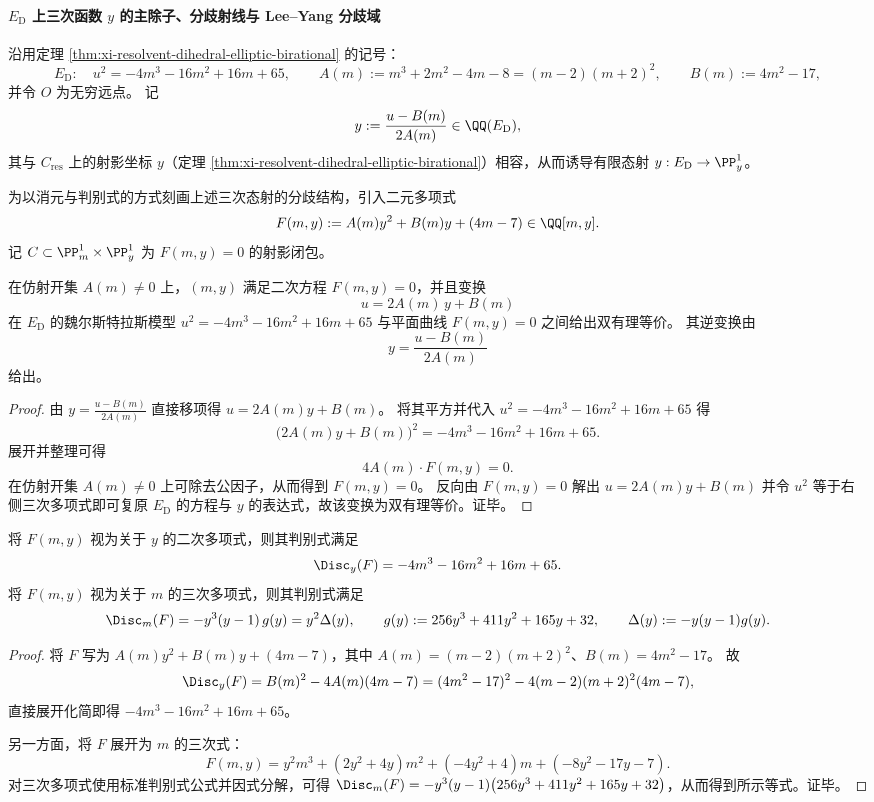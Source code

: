 \paragraph{\texorpdfstring{$E_{\mathrm D}$}{ED} 上三次函数 \texorpdfstring{$y$}{y} 的主除子、分歧射线与 Lee--Yang 分歧域}
沿用定理 \ref{thm:xi-resolvent-dihedral-elliptic-birational} 的记号：
\[
E_{\mathrm D}:\quad u^{2}=-4m^{3}-16m^{2}+16m+65,
\qquad
A(m):=m^{3}+2m^{2}-4m-8=(m-2)(m+2)^{2},
\qquad
B(m):=4m^{2}-17,
\]
并令 \(O\) 为无穷远点。
记
\[
y:=\frac{u-B(m)}{2A(m)}\in \QQ(E_{\mathrm D}),
\]
其与 \(C_{\mathrm{res}}\) 上的射影坐标 \(y\)（定理 \ref{thm:xi-resolvent-dihedral-elliptic-birational}）相容，从而诱导有限态射
\(
y:E_{\mathrm D}\to\PP^1_y
\)。

\par
为以消元与判别式的方式刻画上述三次态射的分歧结构，引入二元多项式
\[
F(m,y):=A(m)y^2+B(m)y+(4m-7)\in\QQ[m,y].
\]
记 \(C\subset \PP^1_m\times \PP^1_y\) 为 \(F(m,y)=0\) 的射影闭包。

\begin{theorem}[二次平面模型与双坐标的显式双有理等价]\label{thm:xi-ed-plane-quadratic-birational-equivalence}
在仿射开集 \(A(m)\neq 0\) 上，\((m,y)\) 满足二次方程 \(F(m,y)=0\)，并且变换
\[
u=2A(m)\,y+B(m)
\]
在 \(E_{\mathrm D}\) 的魏尔斯特拉斯模型 \(u^2=-4m^3-16m^2+16m+65\) 与平面曲线 \(F(m,y)=0\) 之间给出双有理等价。
其逆变换由
\[
y=\frac{u-B(m)}{2A(m)}
\]
给出。
\end{theorem}
\begin{proof}
由 \(y=\frac{u-B(m)}{2A(m)}\) 直接移项得 \(u=2A(m)y+B(m)\)。
将其平方并代入 \(u^2=-4m^3-16m^2+16m+65\) 得
\[
\bigl(2A(m)y+B(m)\bigr)^2=-4m^3-16m^2+16m+65.
\]
展开并整理可得
\[
4A(m)\cdot F(m,y)=0.
\]
在仿射开集 \(A(m)\neq 0\) 上可除去公因子，从而得到 \(F(m,y)=0\)。
反向由 \(F(m,y)=0\) 解出 \(u=2A(m)y+B(m)\) 并令 \(u^2\) 等于右侧三次多项式即可复原 \(E_{\mathrm D}\) 的方程与 \(y\) 的表达式，故该变换为双有理等价。证毕。
\end{proof}

\begin{proposition}[同一二元形式的双判别式恒等式]\label{prop:xi-ed-bivariate-double-discriminant-identities}
将 \(F(m,y)\) 视为关于 \(y\) 的二次多项式，则其判别式满足
\[
\Disc_y(F)=-4m^3-16m^2+16m+65.
\]
将 \(F(m,y)\) 视为关于 \(m\) 的三次多项式，则其判别式满足
\[
\Disc_m(F)=-y^3(y-1)\,g(y)=y^2\Delta(y),
\qquad
g(y):=256y^3+411y^2+165y+32,
\qquad
\Delta(y):=-y(y-1)g(y).
\]
\end{proposition}
\begin{proof}
将 \(F\) 写为 \(A(m)y^2+B(m)y+(4m-7)\)，其中 \(A(m)=(m-2)(m+2)^2\)、\(B(m)=4m^2-17\)。
故
\[
\Disc_y(F)=B(m)^2-4A(m)(4m-7)
=(4m^2-17)^2-4(m-2)(m+2)^2(4m-7),
\]
直接展开化简即得 \(-4m^3-16m^2+16m+65\)。
\par
另一方面，将 \(F\) 展开为 \(m\) 的三次式：
\[
F(m,y)=y^2m^3+(2y^2+4y)m^2+(-4y^2+4)m+(-8y^2-17y-7).
\]
对三次多项式使用标准判别式公式并因式分解，可得
\(
\Disc_m(F)=-y^3(y-1)\bigl(256y^3+411y^2+165y+32\bigr)
\)，从而得到所示等式。证毕。
\end{proof}

